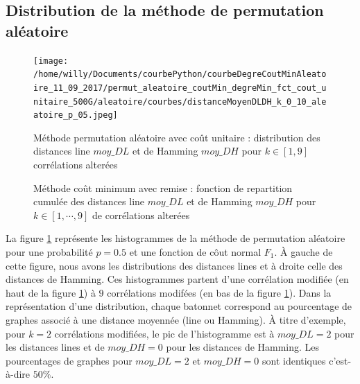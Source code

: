 \documentclass[onecolumn, 12pt]{book}
\begin{document}
\subsection{Distribution de la m\'ethode de permutation al\'eatoire}
\begin{centering} 
\begin{figure}[htb!] 
\texttt{[image: /home/willy/Documents/courbePython/courbeDegreCoutMinAleatoire\_11\_09\_2017/permut\_aleatoire\_coutMin\_degreMin\_fct\_cout\_unitaire\_500G/aleatoire/courbes/distanceMoyenDLDH\_k\_0\_10\_aleatoire\_p\_05.jpeg]}
\caption{ M\'ethode permutation al\'eatoire avec co\^ut unitaire : distribution des distances line $moy\_DL$ et de Hamming $moy\_DH$ pour $k \in [1,  9]$ corr\'elations alter\'ees}
\label{distLineHammingPermutAleatoireK09p05} 
\end{figure}
\end{centering} 
\begin{centering} 
\begin{figure}[htb!] 
\caption{ M\'ethode co\^ut minimum avec remise : fonction de repartition cumul\'ee des distances line $moy\_DL$ et de Hamming $moy\_DH$ pour $k \in [1, \cdots, 9]$ de corr\'elations alter\'ees}
\label{fctRepartitionCumuleDistLineHammingPermutAleatoireK09p05} 
\end{figure}
\end{centering} 
La figure \ref{distLineHammingPermutAleatoireK09p05} repr\'esente les histogrammes de la m\'ethode de permutation al\'eatoire pour une probabilit\'e $p=0.5$ et une fonction de c\^out normal $F_1$. \`A gauche de cette figure, nous avons les distributions des distances lines et \`a droite celle des distances de Hamming. Ces histogrammes partent d'une corr\'elation modifi\'ee (en haut de la figure \ref{distLineHammingPermutAleatoireK09p05}) \`a $9$ corr\'elations  modif\'ees (en bas de la figure \ref{distLineHammingPermutAleatoireK09p05}). 
\newline
Dans la repr\'esentation d'une distribution, chaque batonnet correspond au pourcentage de graphes associ\'e \`a une distance moyenn\'ee (line ou Hamming).
\`A titre d'exemple, pour $k=2$ corr\'elations modifi\'ees, le pic de l'histogramme est \`a $moy\_DL = 2$ pour les distances lines et de $moy\_DH=0$ pour les distances de Hamming. Les pourcentages de graphes pour  $moy\_DL = 2$ et $moy\_DH=0$ sont identiques c'est-\`a-dire $50\%$.
\end{document}
